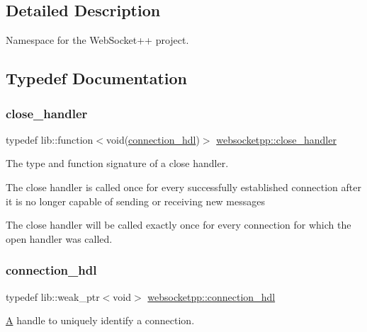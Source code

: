\subsection{Detailed Description}
Namespace for the Web\+Socket++ project. 

\subsection{Typedef Documentation}
\mbox{\label{namespacewebsocketpp_a27acb39e01cbca06ccc4e4e8eb8f877d}} 
\subsubsection{\texorpdfstring{close\+\_\+handler}{close\_handler}}
{\footnotesize\ttfamily typedef lib\+::function$<$void(\mbox{\hyperlink{namespacewebsocketpp_a6b3d26a10ee7229b84b776786332631d}{connection\+\_\+hdl}})$>$ \mbox{\hyperlink{namespacewebsocketpp_a27acb39e01cbca06ccc4e4e8eb8f877d}{websocketpp\+::close\+\_\+handler}}}



The type and function signature of a close handler. 

The close handler is called once for every successfully established connection after it is no longer capable of sending or receiving new messages

The close handler will be called exactly once for every connection for which the open handler was called. \mbox{\label{namespacewebsocketpp_a6b3d26a10ee7229b84b776786332631d}} 
\subsubsection{\texorpdfstring{connection\+\_\+hdl}{connection\_hdl}}
{\footnotesize\ttfamily typedef lib\+::weak\+\_\+ptr$<$void$>$ \mbox{\hyperlink{namespacewebsocketpp_a6b3d26a10ee7229b84b776786332631d}{websocketpp\+::connection\+\_\+hdl}}}



\mbox{\hyperlink{struct_a}{A}} handle to uniquely identify a connection. 

